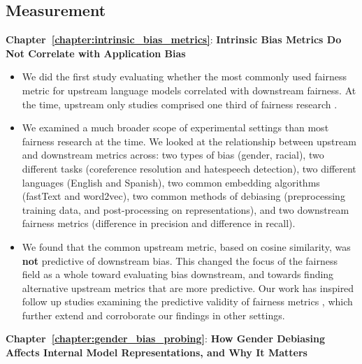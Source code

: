 \subsection{Measurement} 
\textbf{Chapter~\ref{chapter:intrinsic_bias_metrics}}: \textbf{Intrinsic Bias Metrics Do Not Correlate with Application Bias}
\begin{itemize}
    \item We did the first study evaluating whether the most commonly used fairness metric for upstream language models correlated with downstream fairness. At the time, upstream only studies comprised one third of fairness research \citep{blodgett-etal-2020-language}.
    \item We examined a much broader scope of experimental settings than most fairness research at the time. We looked at the relationship between upstream and downstream metrics across: two types of bias (gender, racial), two different tasks (coreference resolution and hatespeech detection), two different languages (English and Spanish), two common embedding algorithms (fastText and word2vec), two common methods of debiasing (preprocessing training data, and post-processing on representations), and two downstream fairness metrics (difference in precision and difference in recall). 
    \item We found that the common upstream metric, based on cosine similarity, was \textbf{not} predictive of downstream bias. This changed the focus of the fairness field as a whole toward evaluating bias downstream, and towards finding alternative upstream metrics that are more predictive. Our work has inspired follow up studies examining the predictive validity of fairness metrics \citep{cao-etal-2022-intrinsic}, which further extend and corroborate our findings in other settings. 
 \end{itemize}

\textbf{Chapter~\ref{chapter:gender_bias_probing}}: \textbf{How Gender Debiasing Affects Internal Model Representations, and Why It Matters}


